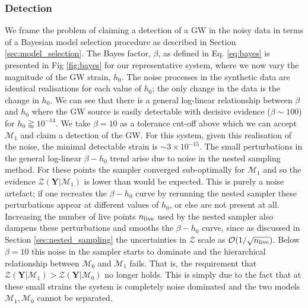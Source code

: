 \documentclass[fleqn,usenatbib,useAMS]{mnras}
\begin{document}
\subsubsection{Detection}
We frame the problem of claiming a detection of a GW in the noisy data in terms of a Bayesian model selection procedure as described in Section \ref{sec:model_selection}. The Bayes factor, $\beta$, as defined in Eq. \ref{eq:bayes} is presented in Fig \ref{fig:bayes} for our representative system, where we now vary the magnitude of the GW strain, $h_0$. The noise processes in the synthetic data are identical realisations for each value of $h_0$; the only change in the data is the change in $h_0$. We can see that there is a general log-linear relationship between $\beta$ and $h_0$ where the GW source is easily detectable with decisive evidence ($\beta \sim 100$) for $h_0 \gtrapprox 10^{-14}$. We take $\beta = 10$ as a tolerance cut-off above which we can accept $\mathcal{M}_1$ and claim a detection of the GW. For this system, given this realisation of the noise, the minimal detectable strain is $\sim 3 \times 10^{-15}$. The small perturbations in the general log-linear $\beta - h_0$ trend arise due to noise in the nested sampling method. For these points the sampler converged sub-optimally for $\mathcal{M}_1$ and so the evidence $\mathcal{Z}(\boldsymbol{Y} | \mathcal{M}_1)$ is lower than would be expected. This is purely a noise artefact; if one recreates the $\beta - h_0$ curve by rerunning the nested sampler these perturbations appear at different values of $h_0$, or else are not present at all. Increasing the number of live points $n_{\rm live}$ used by the nested sampler also dampens these perturbations and smooths the $\beta - h_0$ curve, since as discussed in Section \ref{sec:nested_sampling} the uncertainties in $\mathcal{Z}$ scale as $\mathcal{O}(1/ \sqrt{n_{\rm live}})$. Below $\beta = 10$ this noise in the sampler starts to dominate and the hierarchical relationship between $\mathcal{M}_0$ and  $\mathcal{M}_1$ fails. That is, the requirement that $\mathcal{Z}(\boldsymbol{Y} | \mathcal{M}_1) > \mathcal{Z}(\boldsymbol{Y} | \mathcal{M}_0)$ no longer holds. This is simply due to the fact that at these small strains the system is completely noise dominated and the two models $\mathcal{M}_1, \mathcal{M}_0$ cannot be separated.  
\end{document}
